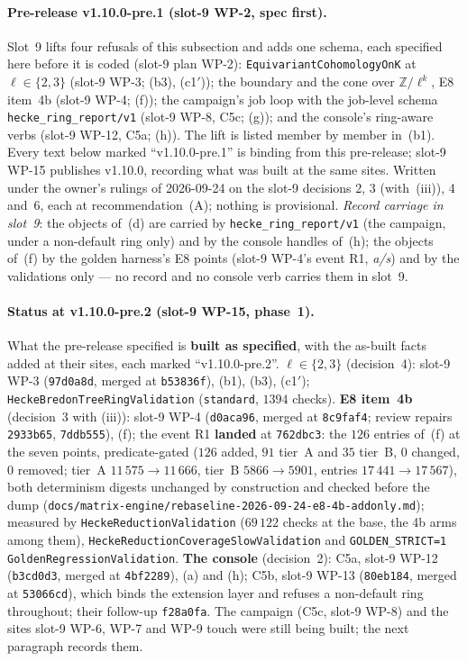 \documentclass[11pt]{article}
\theoremstyle{remark}
\newcommand{\Z}{\mathbb{Z}}
\begin{document}
\paragraph{Pre-release v1.10.0-pre.1 (slot-9 WP-2, spec first).} Slot~9 lifts four refusals of
this subsection and adds one schema, each specified here before it is coded (slot-9 plan WP-2):
\texttt{EquivariantCohomologyOnK} at $\ell\in\{2,3\}$ (slot-9 WP-3; (b3), (c1$'$)); the boundary
and the cone over $\Z/\ell^k$, E8 item~4b (slot-9 WP-4; (f)); the campaign's job loop with the
job-level schema \texttt{hecke\_ring\_report/v1} (slot-9 WP-8, C5c; (g)); and the console's
ring-aware verbs (slot-9 WP-12, C5a; (h)). The lift is listed member by member in~(b1). Every
text below marked ``v1.10.0-pre.1'' is binding from this pre-release; slot-9 WP-15 publishes
v1.10.0, recording what was built at the same sites. Written under the owner's rulings of
2026-09-24 on the slot-9 decisions 2, 3 (with~(iii)), 4 and~6, each at recommendation~(A);
nothing is provisional. \emph{Record carriage in slot~9}: the objects of~(d) are carried by
\texttt{hecke\_ring\_report/v1} (the campaign, under a non-default ring only) and by the console
handles of~(h); the objects of~(f) by the golden harness's E8 points (slot-9 WP-4's event R1,
\emph{a/s}) and by the validations only --- no record and no console verb carries them in slot~9.

\paragraph{Status at v1.10.0-pre.2 (slot-9 WP-15, phase~1).} What the pre-release specified is
\textbf{built as specified}, with the as-built facts added at their sites, each marked
``v1.10.0-pre.2''. \textbf{$\ell\in\{2,3\}$} (decision~4): slot-9 WP-3 (\texttt{97d0a8d}, merged
at \texttt{b53836f}), (b1), (b3), (c1$'$); \texttt{HeckeBredonTreeRingValidation}
(\texttt{standard}, $1394$ checks). \textbf{E8 item~4b} (decision~3 with (iii)): slot-9 WP-4
(\texttt{d0aca96}, merged at \texttt{8c9faf4}; review repairs \texttt{2933b65}, \texttt{7ddb555}),
(f); the event R1 \textbf{landed} at \texttt{762dbc3}: the $126$ entries of~(f) at the seven
points, predicate-gated ($126$ added, $91$ tier~A and $35$ tier~B, $0$ changed, $0$ removed; tier~A
$11\,575\to11\,666$, tier~B $5866\to5901$, entries $17\,441\to17\,567$), both determinism digests
unchanged by construction and checked before the dump
(\texttt{docs/matrix-engine/rebaseline-2026-09-24-e8-4b-addonly.md}); measured by
\texttt{HeckeReductionValidation} ($69\,122$ checks at the base, the 4b arms among them),
\texttt{HeckeReductionCoverageSlowValidation} and \texttt{GOLDEN\_STRICT=1
GoldenRegressionValidation}. \textbf{The console} (decision~2): C5a, slot-9 WP-12
(\texttt{b3cd0d3}, merged at \texttt{4bf2289}), (a) and (h); C5b, slot-9 WP-13 (\texttt{80eb184},
merged at \texttt{53066cd}), which binds the extension layer and refuses a non-default ring
throughout; their follow-up \texttt{f28a0fa}. The campaign (C5c, slot-9 WP-8) and the sites
slot-9 WP-6, WP-7 and WP-9 touch were still being built; the next paragraph records them.
\end{document}
